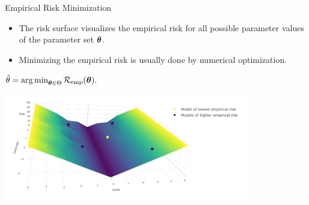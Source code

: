 \documentclass[11pt,compress,t,notes=noshow, xcolor=table]{beamer}
\begin{document}
\begin{vbframe}{Empirical Risk Minimization}

\begin{itemize}
\item \small The risk surface visualizes the empirical risk for all possible parameter values of the parameter set $\bm{\theta}$.
\item \small Minimizing the empirical risk is usually done by numerical optimization.
\end{itemize}

\begin{center}
$
\hat{\theta} = \operatorname{arg\,min}_{\bm{\theta} \in \Theta} \mathcal{R}_{\text{emp}}(\bm{\theta}).
$
\end{center}


\begin{center}
 \includegraphics[width = 0.8\textwidth]{slides/ml-basics/figure_man/nutshell-ml-basics-risk-surface.png}
\end{center}





\end{vbframe}
\end{document}
